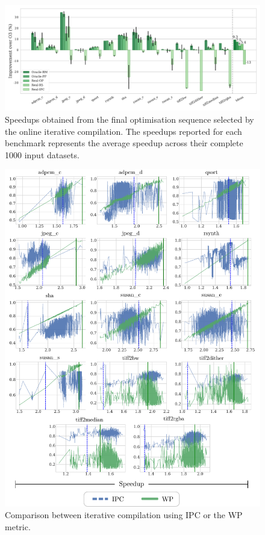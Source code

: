\documentclass[sigplan,10pt]{acmart}
\theoremstyle{definition}
\newcommand{\itercomp}{{iterative compilation}}
\begin{document}
\begin{figure}[htb]
    \centering
    \includegraphics[width=\textwidth]{figs/speedups.pdf}
    \caption{Speedups obtained from the final optimisation sequence selected by the online {\itercomp}.
	         The speedups reported for each benchmark represents the average speedup across their complete 1000 input datasets.}
    \label{fig:speedups}
\end{figure}

\begin{figure}[h]
    \centering
    \includegraphics[width=\textwidth]{figs/ipc-vs-work.pdf}
    \caption{Comparison between {\itercomp} using IPC or the WP metric.}
    \label{fig:ipc-vs-work}
\end{figure}
\end{document}
